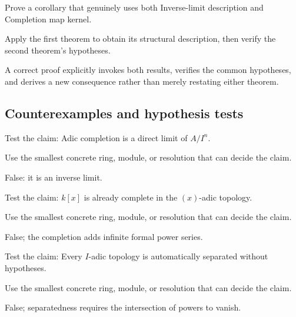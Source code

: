 \begin{exercise}\label{exr:v18-expand-09}
Prove a corollary that genuinely uses both Inverse-limit description and Completion map kernel.
\end{exercise}
\begin{hint}
Apply the first theorem to obtain its structural description, then verify the second theorem's hypotheses.
\end{hint}
\begin{solution}
A correct proof explicitly invokes both results, verifies the common hypotheses, and derives a new consequence rather than merely restating either theorem.
\end{solution}

\subsection*{Counterexamples and hypothesis tests}

\begin{exercise}\label{exr:v18-expand-10}
Test the claim: Adic completion is a direct limit of $A/I^n$.
\end{exercise}
\begin{hint}
Use the smallest concrete ring, module, or resolution that can decide the claim.
\end{hint}
\begin{solution}
False: it is an inverse limit.
\end{solution}

\begin{exercise}\label{exr:v18-expand-11}
Test the claim: $k[x]$ is already complete in the $(x)$-adic topology.
\end{exercise}
\begin{hint}
Use the smallest concrete ring, module, or resolution that can decide the claim.
\end{hint}
\begin{solution}
False; the completion adds infinite formal power series.
\end{solution}

\begin{exercise}\label{exr:v18-expand-12}
Test the claim: Every $I$-adic topology is automatically separated without hypotheses.
\end{exercise}
\begin{hint}
Use the smallest concrete ring, module, or resolution that can decide the claim.
\end{hint}
\begin{solution}
False; separatedness requires the intersection of powers to vanish.
\end{solution}

